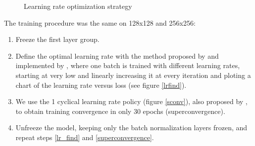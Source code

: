 \documentclass[conference]{IEEEtran}
\begin{document}
\begin{figure}
\centering
{}
\hfil
{}
\caption{Learning rate optimization strategy}\label{lr_find_chart}
\end{figure}

The training procedure was the same on 128x128 and 256x256:
\begin{enumerate}
  \item Freeze the first layer group.
  \item \label{lr_find}Define the optimal learning rate with the method proposed by \cite{leslie} and implemented by \cite{fastai}, where one batch is trained with different learning rates, starting at very low and linearly increasing it at every iteration and ploting a chart of the learning rate versus loss (see figure \ref{lrfind}).
  \item \label{superconvergence}We use the 1 cyclical learning rate policy (figure \ref{sconv}), also proposed by \cite{leslie}, to obtain training convergence in only 30 epochs (superconvergence).
  \item Unfreeze the model, keeping only the batch normalization layers frozen, and repeat steps \ref{lr_find} and \ref{superconvergence}.
\end{enumerate}
\end{document}
